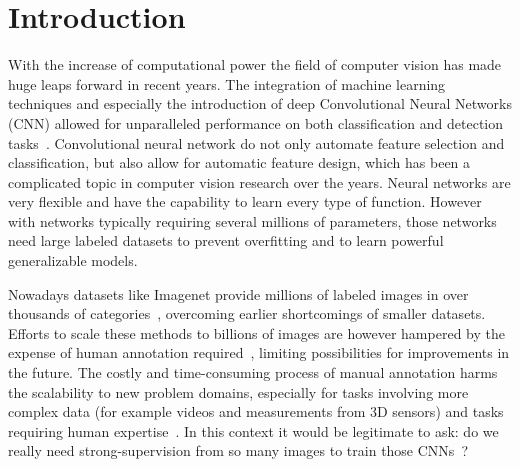 %

% 

\chapter{Introduction}
With the increase of computational power the field of computer vision has made huge leaps forward in recent years. The integration of machine learning techniques and especially the introduction of deep Convolutional Neural Networks (CNN) allowed for unparalleled performance on both classification and detection tasks~\cite{krizhevsky2012}. Convolutional neural network do not only automate feature selection and classification, but also allow for automatic feature design, which has been a complicated topic in computer vision research over the years. Neural networks are very flexible and have the capability to learn every type of function. However with networks typically requiring several millions of parameters, those networks need large labeled datasets to prevent overfitting and to learn powerful generalizable models.

Nowadays datasets like Imagenet provide millions of labeled images in over thousands of categories~\cite{deng2009}, overcoming earlier shortcomings of smaller datasets. Efforts to scale these methods to billions of images are however hampered by the expense of human annotation required~\cite{doersch2015}, limiting possibilities for improvements in the future. The costly and time-consuming process of manual annotation harms the scalability to new problem domains, especially for tasks involving more complex data (for example videos and measurements from 3D sensors) and tasks requiring human expertise~\cite{lee2017,fernando2017}. In this context it would be legitimate to ask: do we really need strong-supervision from so many images to train those CNNs~\cite{wang2015}?

